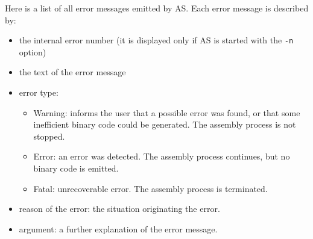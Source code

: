 \documentclass[12pt,twoside]{report}
\newcommand{\tty}[1]{{\tt #1}}
\newcommand{\asname}{{AS}}
\begin{document}
Here is a list of all error messages emitted by \asname{}. Each error message is
described by:
\begin{itemize}
\item{the internal error number (it is displayed only if \asname{} is started with the
      \tty{-n} option)}
\item{the text of the error message}
\item{error type:
      \begin{itemize}
      \item{Warning: informs the user that a possible error was
            found, or that some inefficient binary code
            could be generated. The assembly process is not
            stopped.}
      \item{Error: an error was detected. The assembly process
            continues, but no binary code is emitted.}
      \item{Fatal: unrecoverable error. The assembly process is
            terminated.}
      \end{itemize}}
\item{reason of the error: the situation originating the error.}
\item{argument:  a further explanation of the error message.}
\end{itemize}

\par

\newcommand{\errentry}[5]
           {\item[#1]{#2
                      \begin{description}
                      \item[Type:]{\ \\#3}
                      \item[Reason:]{\ \\#4}
                      \item[Argument:]{\ \\#5}
                      \end{description}}
           }
\end{document}
